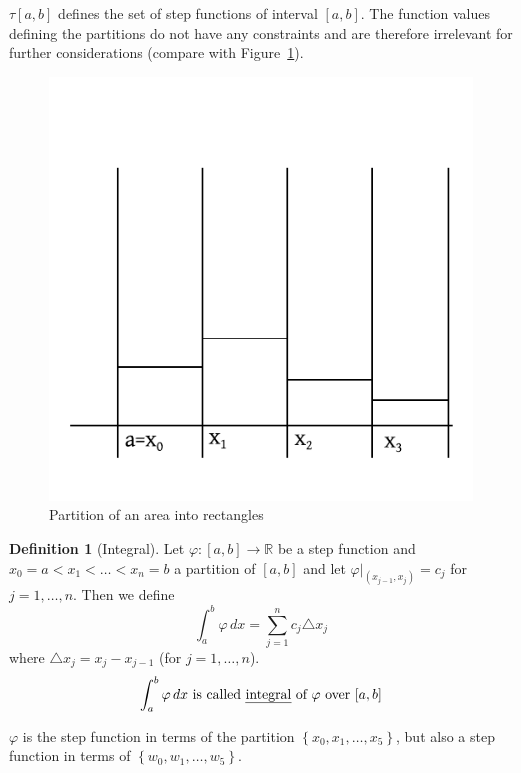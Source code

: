 \documentclass[a4paper,landscape,twocolumn]{article}
\theoremstyle{definition}
\newtheorem{defi}{Definition}
\newcommand\set[1]{\left\{#1\right\}}
\begin{document}
$\tau[a,b]$ defines the set of step functions of interval $[a,b]$.
The function values defining the partitions do not have any constraints and
are therefore irrelevant for further considerations (compare with Figure~\ref{img:partition-int}).

\begin{figure}[!h]
  \begin{center}
    \includegraphics{img/partition-of-integral.pdf}
    \caption{Partition of an area into rectangles}
    \label{img:partition-int}
  \end{center}
\end{figure}

\begin{defi}[Integral]
  Let $\varphi:[a,b] \to \mathbb R$ be a step function and
  $x_0 = a < x_1 < \ldots < x_n = b$ a partition of
  $[a,b]$ and let $\varphi|_{(x_{j-1}, x_j)} = c_j$
  for $j = 1,\ldots,n$.
  Then we define
  \[ \int_a^b \varphi \,dx = \sum_{j=1}^n c_j \triangle x_j \]
  where
  $\triangle x_j = x_j - x_{j-1}$ (for $j=1,\ldots,n$).
  \[ \int_a^b \varphi \, dx \text{ is called \emph{integral} of $\varphi$ over $[a,b]$} \]
\end{defi}

$\varphi$ is the step function in terms of the partition $\set{x_0,x_1,\ldots, x_5}$,
but also a step function in terms of $\set{w_0, w_1, \ldots, w_5}$.
\end{document}
